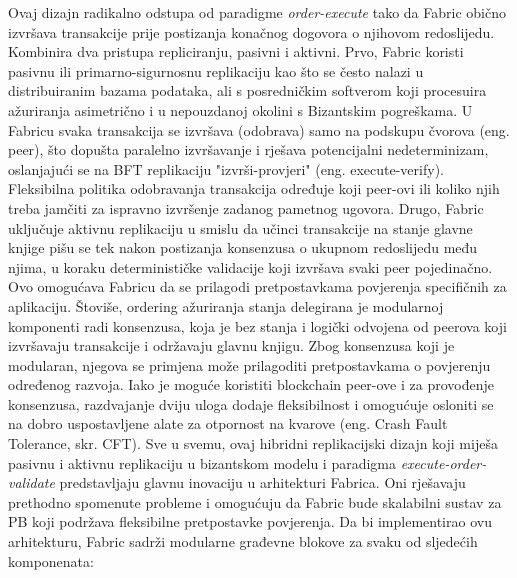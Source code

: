 \documentclass[times, utf8, diplomski]{fer}
\begin{document}
Ovaj dizajn radikalno odstupa od paradigme \textit{order-execute} tako da Fabric obično izvršava transakcije prije postizanja konačnog dogovora o njihovom redoslijedu. Kombinira dva pristupa repliciranju, pasivni i aktivni.
Prvo, Fabric koristi pasivnu ili primarno-sigurnosnu replikaciju kao što se često nalazi u distribuiranim bazama podataka, ali s posredničkim softverom koji procesuira ažuriranja asimetrično i u nepouzdanoj okolini s Bizantskim pogreškama. U Fabricu svaka transakcija se izvršava (odobrava) samo na podskupu čvorova (eng. peer), što dopušta paralelno izvršavanje i rješava potencijalni nedeterminizam, oslanjajući se na BFT replikaciju "izvrši-provjeri" (eng. execute-verify). Fleksibilna politika odobravanja transakcija određuje koji peer-ovi ili koliko njih treba jamčiti za ispravno izvršenje zadanog pametnog ugovora.
Drugo, Fabric uključuje aktivnu replikaciju u smislu da učinci transakcije na stanje glavne knjige pišu se tek nakon postizanja konsenzusa o ukupnom redoslijedu među njima, u koraku determinističke validacije koji izvršava svaki peer pojedinačno. Ovo omogućava Fabricu da se prilagodi pretpostavkama povjerenja specifičnih za aplikaciju.
Štoviše, ordering ažuriranja stanja delegirana je modularnoj komponenti radi konsenzusa, koja je bez stanja i logički odvojena od peerova koji izvršavaju transakcije i održavaju glavnu knjigu. Zbog konsenzusa koji je modularan, njegova se primjena može prilagoditi pretpostavkama o povjerenju određenog razvoja. Iako je moguće koristiti blockchain peer-ove i za provođenje konsenzusa, razdvajanje dviju uloga dodaje fleksibilnost i omogućuje osloniti se na dobro uspostavljene alate za otpornost na kvarove
(eng. Crash Fault Tolerance, skr. CFT). \cite{Fabric}
Sve u svemu, ovaj hibridni replikacijski dizajn koji miješa pasivnu i aktivnu replikaciju u bizantskom modelu i paradigma \textit{execute-order-validate} predstavljaju glavnu inovaciju u arhitekturi Fabrica. Oni rješavaju prethodno spomenute probleme i omogućuju da Fabric bude skalabilni sustav za PB koji podržava fleksibilne pretpostavke povjerenja. Da bi implementirao ovu arhitekturu, Fabric sadrži modularne građevne blokove za svaku od sljedećih komponenata:
\end{document}
